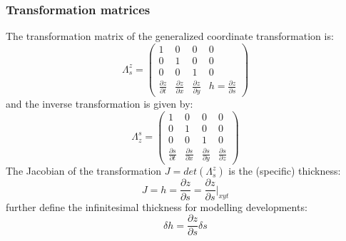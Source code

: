 \subsubsection{Transformation matrices}
\label{annexe_coordS}
The transformation matrix of the generalized coordinate transformation is:
\begin{equation}
    \displaystyle
    \Lambda^z_s=
    \begin{pmatrix}
    1 & 0 & 0 & 0 \\
    0 & 1 & 0 & 0 \\
    0 & 0 & 1 & 0 \\
    \frac{\partial z}{\partial t} & \frac{\partial z}{\partial x}
    & \frac{\partial z}{\partial y} & h=\frac{\partial z}{\partial s}
    \end{pmatrix}
\end{equation}
and the inverse transformation is given by:
\begin{equation}
    \displaystyle
    \Lambda_z^s=
    \begin{pmatrix}
    1 & 0 & 0 & 0 \\
    0 & 1 & 0 & 0 \\
    0 & 0 & 1 & 0 \\
    \frac{\partial s}{\partial t} & \frac{\partial s}{\partial x}
    & \frac{\partial s}{\partial y} & \frac{\partial s}{\partial z}
    \end{pmatrix}
\end{equation}
The Jacobian of the transformation $J=det(\Lambda^z_s)$ is the (specific) thickness:
\begin{equation}
 \displaystyle
 J=h=\frac{\partial z}{\partial s}=\frac{\partial z}{\partial s}\bigg\vert_{xyt}
\end{equation}
\cite{griffies_fundamentals_2004} further define the infinitesimal  thickness for modelling developments:
\begin{equation}
 \displaystyle
 \delta h=\frac{\partial z}{\partial s} \delta s
\end{equation}

